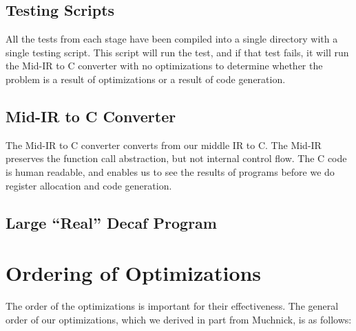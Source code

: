\documentclass[11pt]{article}
\begin{document}
\subsection {Testing Scripts}

All the tests from each stage have been compiled into a single
directory with a single testing script. This script will run the test,
and if that test fails, it will run the Mid-IR to C converter with no
optimizations to determine whether the problem is a result of
optimizations or a result of code generation. 

\subsection {Mid-IR to C Converter} 

The Mid-IR to C converter converts from our middle IR to C. The Mid-IR
preserves the function call abstraction, but not internal control
flow. The C code is human readable, and enables us to see the results
of programs before we do register allocation and code generation.

\subsection {Large ``Real'' Decaf Program}


\section {Ordering of Optimizations} 
\label{sec:order}

The order of the optimizations is important for their
effectiveness. The general order of our optimizations, which we derived
in part from Muchnick, is as follows: 
\end{document}
